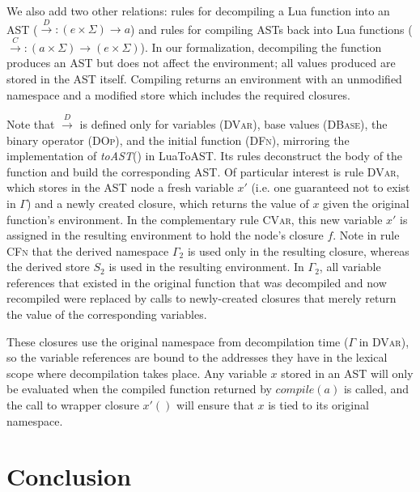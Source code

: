 \documentclass[english]{llncs}
\begin{document}
We also add two other relations: rules for decompiling a Lua function
into an AST ($\overset{D}{\rightarrow}:(e\times\Sigma)\rightarrow a$)
and rules for compiling ASTs back into Lua functions ($\overset{C}{\rightarrow}:(a\times\Sigma)\rightarrow(e\times\Sigma)$).
In our formalization, decompiling the function produces an AST but
does not affect the environment; all values produced are stored in
the AST itself. Compiling returns an environment with an unmodified
namespace and a modified store which includes the required closures. 

Note that $\overset{D}{\rightarrow}$ is defined only for variables
(\textsc{DVar}), base values (\textsc{DBase}), the binary operator
(\textsc{DOp}), and the initial function (\textsc{DFn}), mirroring
the implementation of \emph{toAST}() in LuaToAST. Its rules deconstruct
the body of the function and build the corresponding AST. Of particular
interest is rule \textsc{DVar}, which stores in the AST node a fresh
variable $x'$ (i.e. one guaranteed not to exist in $\Gamma$) and
a newly created closure, which returns the value of $x$ given the
original function's environment. In the complementary rule \textsc{CVar},
this new variable $x'$ is assigned in the resulting environment to
hold the node's closure $f$. Note in rule \textsc{CFn} that the derived
namespace $\Gamma_{2}$ is used only in the resulting closure, whereas
the derived store $S_{2}$ is used in the resulting environment. In
$\Gamma_{2}$, all variable references that existed in the original
function that was decompiled and now recompiled were replaced by calls
to newly-created closures that merely return the value of the corresponding
variables.

These closures use the original namespace from decompilation time
($\Gamma$ in \textsc{DVar}), so the variable references are bound
to the addresses they have in the lexical scope where decompilation
takes place. Any variable $x$ stored in an AST will only be evaluated
when the compiled function returned by $compile(a)$ is called, and
the call to wrapper closure $x'()$ will ensure that $x$ is tied
to its original namespace.

\section{Conclusion}
\label{sec:conclusion}
\end{document}
